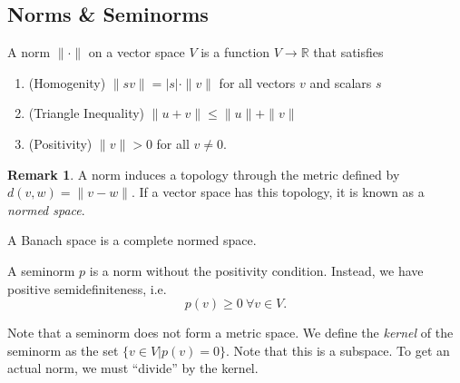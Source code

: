 \documentclass[twoside,symmetric, openany, 12pt]{./tuftebook}
\theoremstyle{definition}
\newtheorem{Remark}[Theorem]{Remark}
\theoremstyle{definition}
\theoremstyle{definition}
\newenvironment{parts}{\begin{enumerate}[label=(\alph*)]}{\end{enumerate}}
\newcommand{\R}{\mathbb{R}}
\begin{document}
	\subsection{Norms \& Seminorms}
	\begin{Definition}[Norm]
		A norm $\|\cdot\|$ on a vector space $V$ is a function $V\to \R$ that satisfies
		\begin{parts}
			\item (Homogenity) $\|sv\|=|s|\cdot \|v\|$ for all vectors $v$ and scalars $s$
			\item (Triangle Inequality) $\|u+v\|\le \|u\| + \|v\|$
			\item (Positivity) $\|v\|>0$ for all $v\neq 0$.  
		\end{parts}
	\end{Definition}
	\begin{Remark}
		A norm induces a topology through the metric defined by $d(v, w)=\|v-w\|$. If a vector space has this topology, it is known as a \emph{normed space}.
	\end{Remark}
	\begin{Definition}
		A Banach space is a complete normed space.
\end{Definition}
	\begin{Definition}[Seminorm]
		A seminorm $p$ is a norm without the positivity condition. Instead, we have positive semidefiniteness, i.e.
		\[p(v)\ge 0~\forall v\in V.\]
	\end{Definition}
	Note that a seminorm does not form a metric space. We define the \emph{kernel} of the seminorm as the set $\{v\in V|p(v)=0\}$. Note that this is a subspace. To get an actual norm, we must ``divide'' by the kernel.
	
\end{document}

